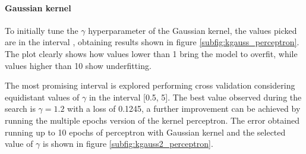 \documentclass{article}
\begin{document}
\paragraph{Gaussian kernel}
To initially tune the $\gamma$ hyperparameter of the Gaussian kernel, the values picked are in the interval , obtaining results shown in figure \ref{subfig:kgauss_perceptron}. The plot clearly shows how values lower than 1 bring the model to overfit, while values higher than 10 show underfitting. 

The most promising interval is explored performing cross validation considering equidistant values of $\gamma$ in the interval [0.5, 5]. The best value observed during the search is $\gamma=1.2$ with a loss of 0.1245, a further improvement can be achieved by running the multiple epochs version of the kernel perceptron. The error obtained running up to 10 epochs of perceptron with Gaussian kernel and the selected value of $\gamma$ is shown in figure \ref{subfig:kgauss2_perceptron}.
\end{document}
